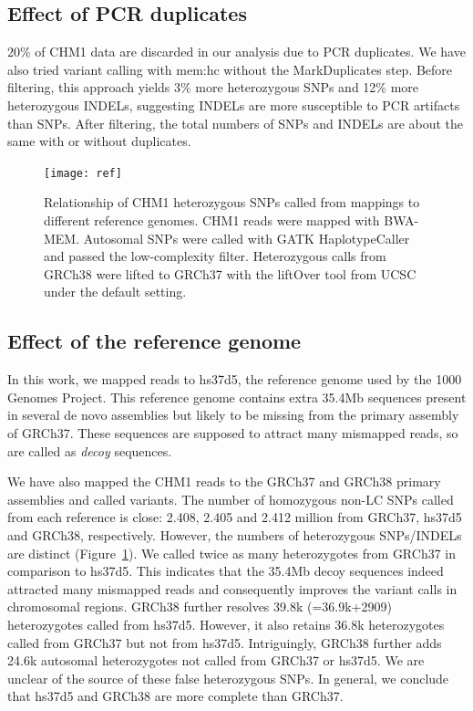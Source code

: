 \documentclass{bioinfo}
\begin{document}
\subsection{Effect of PCR duplicates}
20\% of CHM1 data are discarded in our analysis due to PCR duplicates. We have
also tried variant calling with mem:hc without the MarkDuplicates step. Before
filtering, this approach yields 3\% more heterozygous SNPs and 12\% more
heterozygous INDELs, suggesting INDELs are more susceptible to PCR artifacts
than SNPs. After filtering, the total numbers of SNPs and INDELs are about the
same with or without duplicates.

\begin{figure}[!hbtp]
\centering
\texttt{[image: ref]}
\caption{Relationship of CHM1 heterozygous SNPs called from mappings to
different reference genomes. CHM1 reads were mapped with BWA-MEM. Autosomal
SNPs were called with GATK HaplotypeCaller and passed the low-complexity
filter. Heterozygous calls from GRCh38 were lifted to GRCh37 with the liftOver
tool from UCSC under the default setting.}\label{fig:ref}
\end{figure}

\subsection{Effect of the reference genome}\label{sec:ref}
In this work, we mapped reads to hs37d5, the reference genome used by the 1000
Genomes Project. This reference genome contains extra 35.4Mb sequences present
in several de novo assemblies but likely to be missing from the primary
assembly of GRCh37. These sequences are supposed to attract many mismapped
reads, so are called as \emph{decoy} sequences.

We have also mapped the CHM1 reads to the GRCh37 and GRCh38 primary assemblies
and called variants. The number of homozygous non-LC SNPs called from each
reference is close: 2.408, 2.405 and 2.412 million from GRCh37, hs37d5 and
GRCh38, respectively. However, the numbers of heterozygous SNPs/INDELs are
distinct (Figure~\ref{fig:ref}).  We called twice as many heterozygotes from
GRCh37 in comparison to hs37d5.  This indicates that the 35.4Mb decoy sequences
indeed attracted many mismapped reads and consequently improves the variant
calls in chromosomal regions.  GRCh38 further resolves 39.8k (=36.9k+2909)
heterozygotes called from hs37d5.  However, it also retains 36.8k heterozygotes
called from GRCh37 but not from hs37d5. Intriguingly, GRCh38 further adds 24.6k
autosomal heterozygotes not called from GRCh37 or hs37d5. We are unclear of the
source of these false heterozygous SNPs. In general, we conclude that hs37d5
and GRCh38 are more complete than GRCh37.
\end{document}

